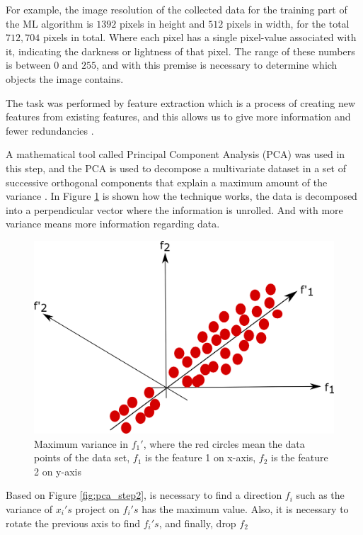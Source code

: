 For example, the image resolution of the collected data for the training part of the ML algorithm is $1392$ pixels in height and $512$ pixels in width, for the total $712,704$ pixels in total. Where each pixel has a single pixel-value associated with it, indicating the darkness or lightness of that pixel. The range of these numbers is between $0$ and $255$, and with this premise is necessary to determine which objects the image contains.

The task was performed by feature extraction which is a process of creating new features from existing features, and this allows us to give more information and fewer redundancies \cite{wang2019data}.

A mathematical tool called Principal Component Analysis (PCA) was used in this step, and the PCA is used to decompose a multivariate dataset in a set of successive orthogonal components that explain a maximum amount of the variance \cite{pedregosa2011scikit}. In Figure \ref{fig:pca_step1} is shown how the technique works, the data is decomposed into a perpendicular vector where the information is unrolled. And with more variance means more information regarding data.

\begin{figure}[H]
\centering
\includegraphics[scale=0.7]{imagens/pca1.png}
\caption{Maximum variance in $f_1'$, where the red circles mean the data points of the data set, $f_1$ is the feature 1 on x-axis, $f_2$ is the feature 2 on y-axis}
\label{fig:pca_step1}
\end{figure}


Based on Figure \ref{fig:pca_step2}, is necessary to find a direction $f_i$ such as the variance of $x_i's$ project on $f_i's$ has the maximum value. Also, it is necessary to rotate the previous axis to find $f_i's$, and finally, drop $f_2$


